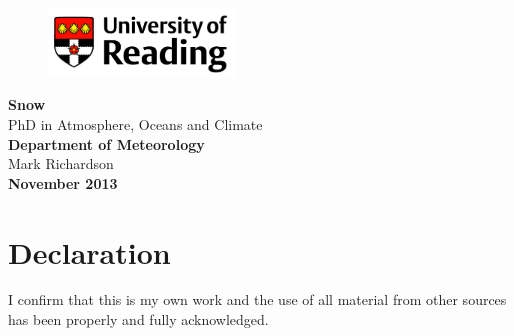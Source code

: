 \begin{titlepage}
\begin{flushright}
\begin{figure}[h]
\begin{flushright}
  \vspace{-2cm}
\includegraphics[width=50mm]{PLOTS/reading_logo.png} %
\end{flushright}
\end{figure}
\end{flushright}
\begin{flushleft}
  \vspace{4cm}
\Huge{\bf{Snow}}\\
\huge{PhD in Atmosphere, Oceans and Climate} \\
\Large{\bf{Department of Meteorology}}\\
\vspace{2cm}
\huge{Mark Richardson} \\
\Large{\bf{November 2013}}\\
\end{flushleft}
\end{titlepage}

\thispagestyle{empty}


\vspace{40mm}
\chapter*{\centering \Large \vspace{-20mm}\Huge Declaration}
\thispagestyle{headings}

\par I confirm that this is my own work and the use of all material from other sources has been properly and fully acknowledged.

